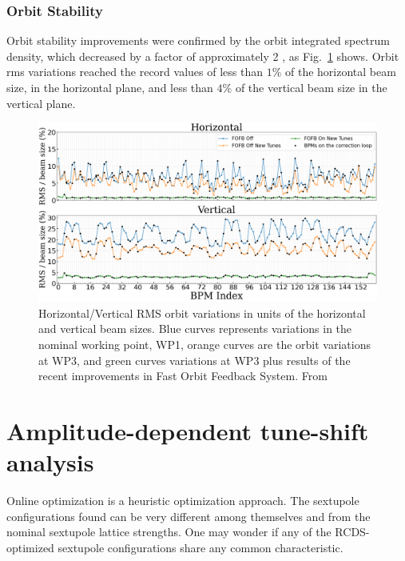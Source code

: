 \subsubsection{Orbit Stability}
Orbit stability improvements were confirmed by the orbit integrated spectrum density, which decreased by a factor of approximately 2 \cite{liu_status_2023}, as Fig.~\ref{fig:integrated_spec} shows. Orbit rms variations reached the record values of less than $1\%$ of the horizontal beam size, in the horizontal plane, and less than $4\%$ of the vertical beam size in the vertical plane.


\begin{figure}[tb]
    \centering
    \includegraphics[width=\textwidth]{Images/WEOGA2_f5.png}
    \caption[Horizontal/Vertical RMS orbit variations in units of the horizontal and vertical beam sizes.]{Horizontal/Vertical RMS orbit variations in units of the horizontal and vertical beam sizes. Blue curves represents variations in the nominal working point, WP1, orange curves are the orbit variations at WP3, and green curves variations at WP3 plus results of the recent improvements in Fast Orbit Feedback System. From~\cite{liu_status_2023}}
    \label{fig:integrated_spec}
\end{figure}

\section{Amplitude-dependent tune-shift analysis}
Online optimization is a heuristic optimization approach. The sextupole configurations found can be very different among themselves and from the nominal sextupole lattice strengths. One may wonder if any of the RCDS-optimized sextupole configurations share any common characteristic.

